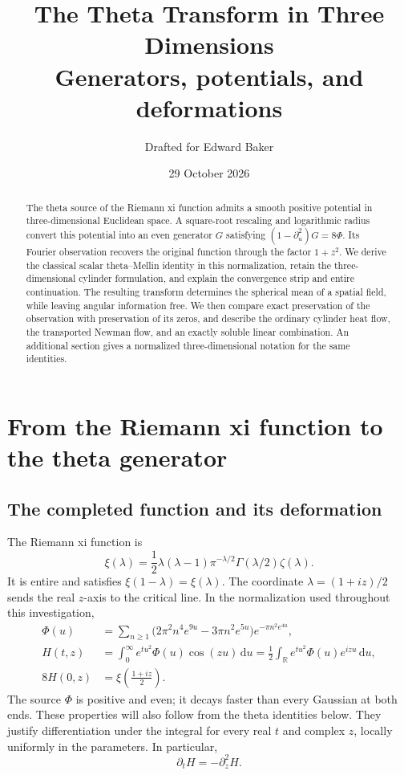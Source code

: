 \documentclass[11pt]{article}
\title{The Theta Transform in Three Dimensions\\[4pt]
\large Generators, potentials, and deformations}
\author{Drafted for Edward Baker}
\date{29 October 2026}
\theoremstyle{remark}
\numberwithin{equation}{section}
\newcommand{\R}{\mathbb R}
\newcommand{\dd}{\,\mathrm d}
\begin{document}
\maketitle

\begin{abstract}
The theta source of the Riemann xi function admits a smooth positive
potential in three-dimensional Euclidean space. A square-root rescaling
and logarithmic radius convert this potential into an even generator
\(G\) satisfying \((1-\partial_u^2)G=8\Phi\). Its Fourier observation
recovers the original function through the factor \(1+z^2\).
We derive the classical scalar theta--Mellin identity in this
normalization, retain the three-dimensional cylinder formulation, and
explain the convergence
strip and entire continuation. The resulting transform determines the
spherical mean of a spatial field, while leaving angular information
free. We then compare exact preservation of the observation with
preservation of its zeros, and describe the ordinary cylinder heat flow,
the transported Newman flow, and an exactly soluble linear combination.
An additional section gives a normalized three-dimensional notation for
the same identities.
\end{abstract}

\section{From the Riemann xi function to the theta generator}
\label{sec:opening}

\subsection{The completed function and its deformation}

The Riemann xi function is
\begin{equation}\label{eq:xi}
 \xi(\lambda)=\frac12\lambda(\lambda-1)\pi^{-\lambda/2}
 \Gamma(\lambda/2)\zeta(\lambda).
\end{equation}
It is entire and satisfies \(\xi(1-\lambda)=\xi(\lambda)\).
The coordinate \(\lambda=(1+iz)/2\) sends the real \(z\)-axis to
the critical line. In the normalization used throughout this investigation,
\begin{align}
 \Phi(u)&=\sum_{n\ge1}
 \bigl(2\pi^2n^4e^{9u}-3\pi n^2e^{5u}\bigr)
 e^{-\pi n^2e^{4u}},\label{eq:phi}\\
 H(t,z)&=\int_0^\infty e^{tu^2}\Phi(u)\cos(zu)\dd u
 =\frac12\int_{\R}e^{tu^2}\Phi(u)e^{izu}\dd u,\label{eq:H}\\
 8H(0,z)&=\xi\!\left(\frac{1+iz}{2}\right).\label{eq:normalization}
\end{align}
The source \(\Phi\) is positive and even; it decays faster than every
Gaussian at both ends. These properties will also follow from the theta
identities below. They justify differentiation under the integral for
every real \(t\) and complex \(z\), locally uniformly in the parameters.
In particular,
\begin{equation}\label{eq:backwardheat}
 \boxed{\partial_t H=-\partial_z^2 H.}
\end{equation}
\end{document}
